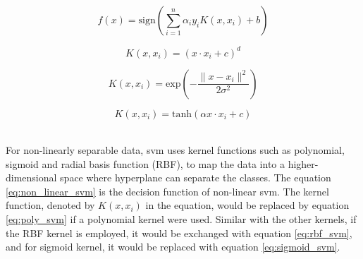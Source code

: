 \begin{figure}[!ht]
    \begin{minipage}{0.45\linewidth}
        \begin{equation}
            f(x) = \text{sign}(\sum_{i=1}^{n} \alpha_{i}y_{i}K(x,x_{i}) + b) \label{eq:non_linear_svm}
        \end{equation}
    \end{minipage}
    \hfill
    \begin{minipage}{0.45\linewidth}
        \begin{equation}
            K(x,x_{i}) = (x \cdot x_{i} + c)^{d} \label{eq:poly_svm}
        \end{equation}
    \end{minipage}

    \begin{minipage}{0.45\linewidth}
        \begin{equation}
            K(x,x_{i}) = \text{exp}(-\frac{\parallel x - x_{i} \parallel ^ {2}}{2 \sigma ^ {2}}) \label{eq:rbf_svm}
        \end{equation}
    \end{minipage}
    \hfill
    \begin{minipage}{0.45\linewidth}
        \begin{equation}
            K(x,x_{i}) = \text{tanh}(\alpha x \cdot x_{i} + c) \label{eq:sigmoid_svm}
        \end{equation}
    \end{minipage}
\end{figure}
\\
\indent For non-linearly separable data, \gls{svm} uses kernel functions such as polynomial, sigmoid and radial basis function (RBF), to map the data into a higher-dimensional space where hyperplane can separate the classes.
The equation \ref{eq:non_linear_svm} is the decision function of non-linear \gls{svm}. 
The kernel function, denoted by $K(x,x_{i})$ in the equation, would be replaced by equation \ref{eq:poly_svm} if a polynomial kernel were used.
Similar with the other kernels, if the RBF kernel is employed, it would be exchanged with equation \ref{eq:rbf_svm}, and for sigmoid kernel, it would be replaced with equation \ref{eq:sigmoid_svm}.

